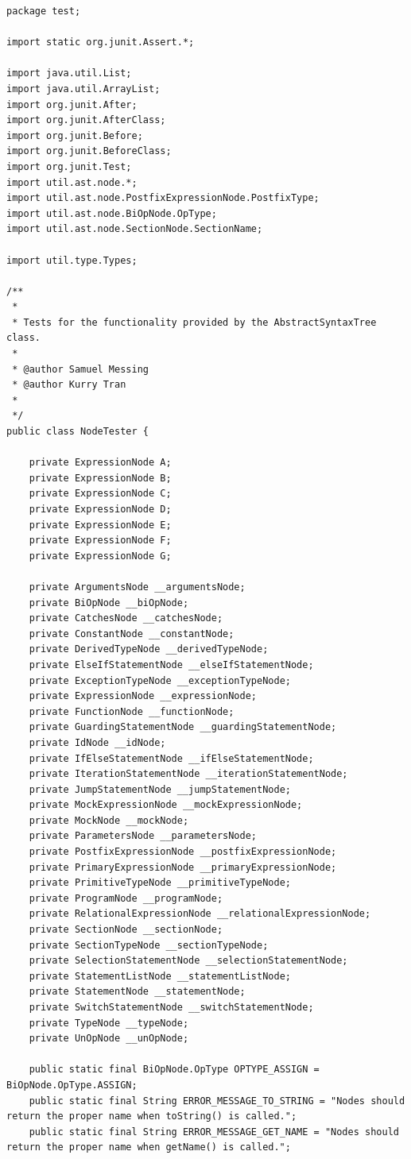 \documentclass{report}
\begin{document}
\begin{verbatim}
package test;

import static org.junit.Assert.*;

import java.util.List;
import java.util.ArrayList;
import org.junit.After;
import org.junit.AfterClass;
import org.junit.Before;
import org.junit.BeforeClass;
import org.junit.Test;
import util.ast.node.*;
import util.ast.node.PostfixExpressionNode.PostfixType;
import util.ast.node.BiOpNode.OpType;
import util.ast.node.SectionNode.SectionName;

import util.type.Types;

/**
 * 
 * Tests for the functionality provided by the AbstractSyntaxTree class.
 * 
 * @author Samuel Messing
 * @author Kurry Tran
 * 
 */
public class NodeTester {

	private ExpressionNode A;
	private ExpressionNode B;
	private ExpressionNode C;
	private ExpressionNode D;
	private ExpressionNode E;
	private ExpressionNode F;
	private ExpressionNode G;
	
	private ArgumentsNode __argumentsNode;
	private BiOpNode __biOpNode;
	private CatchesNode __catchesNode;
	private ConstantNode __constantNode;
	private DerivedTypeNode __derivedTypeNode;
	private ElseIfStatementNode __elseIfStatementNode;
	private ExceptionTypeNode __exceptionTypeNode;
	private ExpressionNode __expressionNode;
	private FunctionNode __functionNode;
	private GuardingStatementNode __guardingStatementNode;
	private IdNode __idNode;
	private IfElseStatementNode __ifElseStatementNode;
	private IterationStatementNode __iterationStatementNode;
	private JumpStatementNode __jumpStatementNode;
	private MockExpressionNode __mockExpressionNode;
	private MockNode __mockNode;
	private ParametersNode __parametersNode;
	private PostfixExpressionNode __postfixExpressionNode;
	private PrimaryExpressionNode __primaryExpressionNode;
	private PrimitiveTypeNode __primitiveTypeNode;
	private ProgramNode __programNode;
	private RelationalExpressionNode __relationalExpressionNode;
	private SectionNode __sectionNode;
	private SectionTypeNode __sectionTypeNode;
	private SelectionStatementNode __selectionStatementNode;
	private StatementListNode __statementListNode;
	private StatementNode __statementNode;
	private SwitchStatementNode __switchStatementNode;
	private TypeNode __typeNode;
	private UnOpNode __unOpNode;

	public static final BiOpNode.OpType OPTYPE_ASSIGN = BiOpNode.OpType.ASSIGN;
	public static final String ERROR_MESSAGE_TO_STRING = "Nodes should return the proper name when toString() is called.";
	public static final String ERROR_MESSAGE_GET_NAME = "Nodes should return the proper name when getName() is called.";



\end{verbatim}
\end{document}
